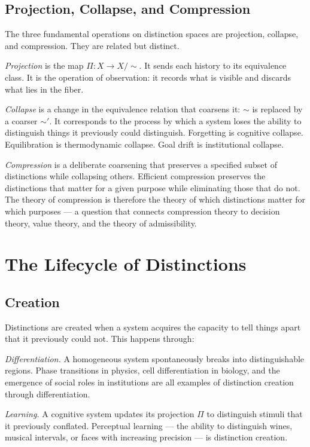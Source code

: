\documentclass[12pt,a4paper]{book}
\theoremstyle{remark}
\theoremstyle{definition}
\begin{document}
\section{Projection, Collapse, and Compression}

The three fundamental operations on distinction spaces are projection,
collapse, and compression. They are related but distinct.

\textit{Projection} is the map $\Pi : X \to X/{\sim}$. It sends each
history to its equivalence class. It is the operation of observation:
it records what is visible and discards what lies in the fiber.

\textit{Collapse} is a change in the equivalence relation that coarsens
it: $\sim$ is replaced by a coarser $\sim'$. It corresponds to the
process by which a system loses the ability to distinguish things it
previously could distinguish. Forgetting is cognitive collapse.
Equilibration is thermodynamic collapse. Goal drift is institutional
collapse.

\textit{Compression} is a deliberate coarsening that preserves a
specified subset of distinctions while collapsing others. Efficient
compression preserves the distinctions that matter for a given purpose
while eliminating those that do not. The theory of compression is
therefore the theory of which distinctions matter for which purposes ---
a question that connects compression theory to decision theory, value
theory, and the theory of admissibility.

\chapter{The Lifecycle of Distinctions}

\section{Creation}

Distinctions are created when a system acquires the capacity to tell
things apart that it previously could not. This happens through:

\textit{Differentiation.} A homogeneous system spontaneously breaks into
distinguishable regions. Phase transitions in physics, cell differentiation
in biology, and the emergence of social roles in institutions are all
examples of distinction creation through differentiation.

\textit{Learning.} A cognitive system updates its projection $\Pi$ to
distinguish stimuli that it previously conflated. Perceptual learning ---
the ability to distinguish wines, musical intervals, or faces with
increasing precision --- is distinction creation.
\end{document}
